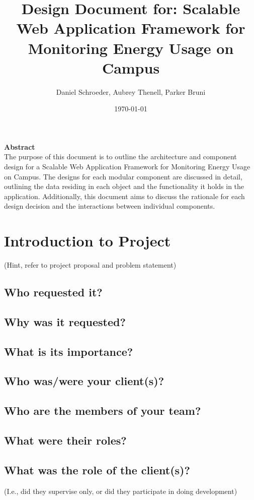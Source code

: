 \documentclass[journal,10pt,onecolumn,compsoc]{IEEEtran}
\title{Design Document for: \linebreak Scalable Web Application Framework for Monitoring Energy Usage on Campus}
\author{Daniel Schroeder, Aubrey Thenell, Parker Bruni}
\date{\today}
\begin{document}
    \maketitle
    \vspace{2cm}
    \begin{center}
    \noindent \textbf{Abstract} \\
                \indent The purpose of this document is to outline the architecture and component design for a Scalable Web Application Framework for Monitoring Energy Usage on Campus. The designs for each modular component are discussed in detail, outlining the data residing in each object and the functionality it holds in the application. Additionally, this document aims to discuss the rationale for each design decision and the interactions between individual components. 
    \end{center}         
    
    \newpage
    \tableofcontents
        
    \section{Introduction to Project} 
    (Hint, refer to project proposal and problem statement)
    \subsection{Who requested it?}
    \subsection{Why was it requested?}
    \subsection{What is its importance?}
    \subsection{Who was/were your client(s)?}
    \subsection{Who are the members of your team?}
    \subsection{What were their roles?}
    \subsection{What was the role of the client(s)?} (I.e., did they supervise only, or did they participate in doing development)
\end{document}
